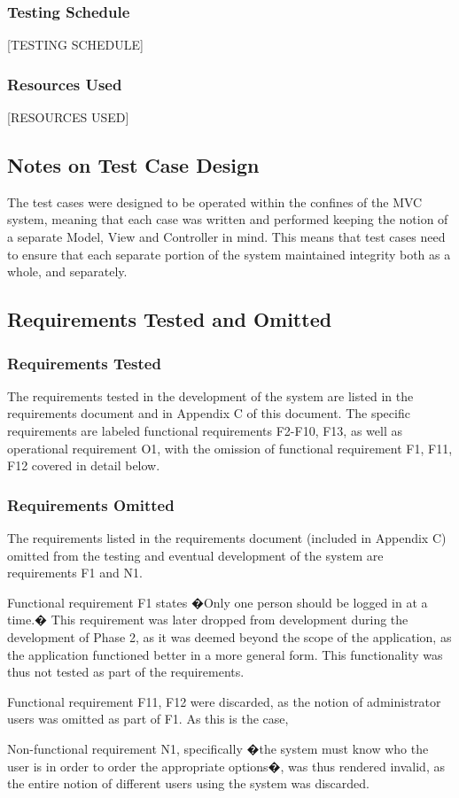 \documentclass[12pt]{article}
\begin{document}
\subsubsection{Testing Schedule}
{
[TESTING SCHEDULE]
}
\subsubsection{Resources Used}
{
[RESOURCES USED]
}
\subsection{Notes on Test Case Design}
{
The test cases were designed to be operated within the confines of the MVC system, meaning that each case was written and performed keeping the notion of a separate Model, View and Controller in mind. This means that test cases need to ensure that each separate portion of the system maintained integrity both as a whole, and separately.
}
\subsection{Requirements Tested and Omitted}
\subsubsection{Requirements Tested} \label{rt:1}
       
{
The requirements tested in the development of the system are listed in the requirements document and in Appendix C of this document. The specific requirements are labeled functional requirements F2-F10, F13, as well as operational requirement O1, with the omission of functional requirement F1, F11, F12 covered in detail below.
}

\subsubsection{Requirements Omitted} \label{rt:2}

{
The requirements listed in the requirements document (included in Appendix C) omitted from the testing and eventual development of the system are requirements F1 and N1.

Functional requirement F1 states �Only one person should be logged in at a time.� This requirement was later dropped from development during the development of Phase 2, as it was deemed beyond the scope of the application, as the application functioned better in a more general form. This functionality was thus not tested as part of the requirements.

Functional requirement F11, F12 were discarded, as the notion of administrator users was omitted as part of F1. As this is the case,

Non-functional requirement N1, specifically �the system must know who the user is in order to order the appropriate options�, was thus rendered invalid, as the entire notion of different users using the system was discarded.
}
\end{document}
